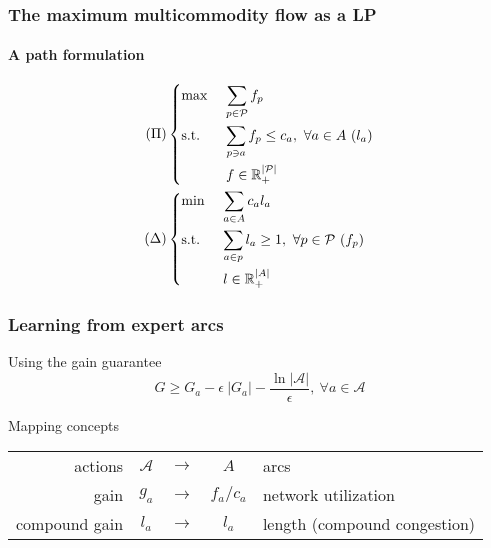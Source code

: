 \documentclass{beamer}
\begin{document}
\begin{frame}
    \frametitle{The maximum multicommodity flow as a LP}
    \framesubtitle{A path formulation}

    \begin{align*}
    (\Pi) & \begin{dcases}
    \max~ & \sum_{p\in\mathcal{P}} f_p\\
    \text{s.t.}~& \sum_{p\ni a} f_p \leq c_a,~\forall a\in A ~(l_a)\\
    & f \in \mathbb{R}_+^{|\mathcal{P}|}
    \end{dcases}
    \\
    (\Delta) & \begin{dcases}
    \min~ & \sum_{a\in A} c_a l_a\\
    \text{s.t.}~& \sum_{a\in p} l_a \geq 1,~\forall p\in \mathcal{P} ~(f_p)\\
    & l \in \mathbb{R}_+^{|A|}
    \end{dcases}
    \end{align*}

\end{frame}

\begin{frame}
    \frametitle{Learning from expert arcs}

    \begin{block}{Using the gain guarantee}
        \begin{equation*}
            G \geq G_a - \epsilon~|G_a| - \dfrac{\ln |\mathcal{A}|}{\epsilon},
            ~\forall a\in \mathcal{A}
        \end{equation*}
    \end{block}

    \begin{block}{Mapping concepts}
    \begin{tabular}{r | c c c | l}
    actions & $\mathcal{A}$ & $\to$ & $A$ & arcs\\
    gain & $g_a$ & $\to$ & $f_a / c_a$ & network utilization\\
    compound gain & $l_a$ & $\to$ & $l_a$ & length (compound congestion)
    \end{tabular}
    \end{block}

\end{frame}
\end{document}
